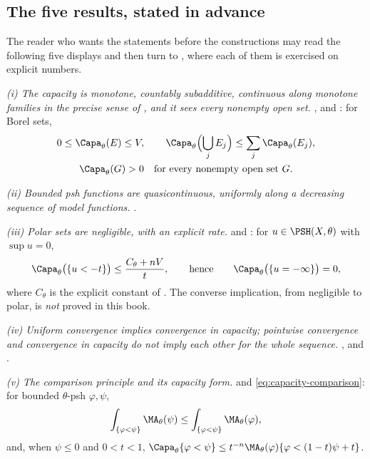 \subsection{The five results, stated in advance}
\label{sec:ch25-payoff}

The reader who wants the statements before the constructions may read the
following five displays and then turn to , where each
of them is exercised on explicit numbers.

\emph{(i) The capacity is monotone, countably subadditive, continuous along
monotone families in the precise sense of
, and it sees every nonempty open set.}
,
 and :
for Borel sets,
\[
 \begin{gathered}
 0\leq\Capa_\theta(E)\leq V,
 \qquad
 \Capa_\theta\Bigl(\bigcup_j E_j\Bigr)\leq\sum_j\Capa_\theta(E_j),\\
 \Capa_\theta(G)>0\quad\text{for every nonempty open set }G.
 \end{gathered}
\]

\emph{(ii) Bounded psh functions are quasicontinuous, uniformly along a
decreasing sequence of model functions.}
.

\emph{(iii) Polar sets are negligible, with an explicit rate.}
 and
: for $u\in\PSH(X,\theta)$ with
$\sup u=0$,
\[
 \Capa_\theta\bigl(\{u<-t\}\bigr)\leq\frac{C_\theta+nV}{t},
 \qquad\text{hence}\qquad
 \Capa_\theta\bigl(\{u=-\infty\}\bigr)=0 ,
\]
where $C_\theta$ is the explicit constant of
.  The converse implication, from negligible
to polar, is \emph{not} proved in this book.

\emph{(iv) Uniform convergence implies convergence in capacity; pointwise
convergence and convergence in capacity do not imply each other for the
whole sequence.}  ,
 and
.

\emph{(v) The comparison principle and its capacity form.}
 and
\eqref{eq:capacity-comparison}: for bounded $\theta$-psh
$\varphi,\psi$,
\[
 \int_{\{\varphi<\psi\}}\MA_\theta(\psi)
 \leq\int_{\{\varphi<\psi\}}\MA_\theta(\varphi),
\]
and, when $\psi\leq0$ and $0<t<1$,
$\Capa_\theta\{\varphi<\psi\}
 \leq t^{-n}\MA_\theta(\varphi)\{\varphi<(1-t)\psi+t\}$.


